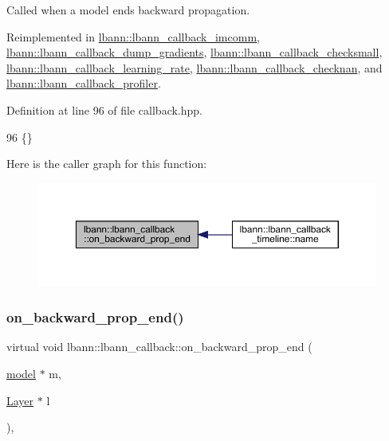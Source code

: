 Called when a model ends backward propagation. 

Reimplemented in \hyperlink{classlbann_1_1lbann__callback__imcomm_a0a425ba562f7637b25cd6ba094e7885b}{lbann\+::lbann\+\_\+callback\+\_\+imcomm}, \hyperlink{classlbann_1_1lbann__callback__dump__gradients_a2485599f66842eda62c8bc8d4d44ef02}{lbann\+::lbann\+\_\+callback\+\_\+dump\+\_\+gradients}, \hyperlink{classlbann_1_1lbann__callback__checksmall_aade56a328c4b9df28c0cd979eed9e5ff}{lbann\+::lbann\+\_\+callback\+\_\+checksmall}, \hyperlink{classlbann_1_1lbann__callback__learning__rate_ab6aa0530604e32a1be2b37f3933f6bf6}{lbann\+::lbann\+\_\+callback\+\_\+learning\+\_\+rate}, \hyperlink{classlbann_1_1lbann__callback__checknan_a40d9a9fcc5849746570b99321e1c5488}{lbann\+::lbann\+\_\+callback\+\_\+checknan}, and \hyperlink{classlbann_1_1lbann__callback__profiler_a8a4ba2640d128992a519ab4a2b7c44aa}{lbann\+::lbann\+\_\+callback\+\_\+profiler}.



Definition at line 96 of file callback.\+hpp.


\begin{DoxyCode}
96 \{\}
\end{DoxyCode}
Here is the caller graph for this function\+:\nopagebreak
\begin{figure}[H]
\begin{center}
\leavevmode
\includegraphics[width=350pt]{classlbann_1_1lbann__callback_af183624e63ba65e0003fa988f53dee0c_icgraph}
\end{center}
\end{figure}
\mbox{\label{classlbann_1_1lbann__callback_aba03b59c056ace8094095c08e39b9ac4}} 
\subsubsection{\texorpdfstring{on\+\_\+backward\+\_\+prop\+\_\+end()}{on\_backward\_prop\_end()}\hspace{0.1cm}{\footnotesize\ttfamily [2/2]}}
{\footnotesize\ttfamily virtual void lbann\+::lbann\+\_\+callback\+::on\+\_\+backward\+\_\+prop\+\_\+end (\begin{DoxyParamCaption}\item[{\hyperlink{classlbann_1_1model}{model} $\ast$}]{m,  }\item[{\hyperlink{classlbann_1_1Layer}{Layer} $\ast$}]{l }\end{DoxyParamCaption})\hspace{0.3cm}{\ttfamily [inline]}, {\ttfamily [virtual]}}

